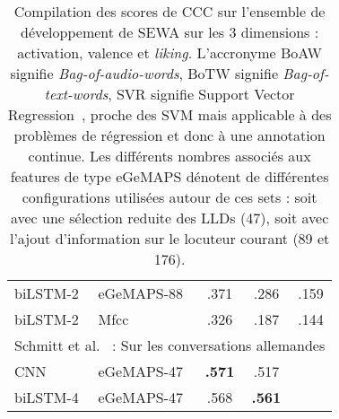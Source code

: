 \begin{table}[]
\begin{tabular}{| l | l | c | c | c |}
        \hline
        biLSTM-2 &eGeMAPS-88  &.371 &.286 &.159 \\
        biLSTM-2 &Mfcc        &.326 &.187 &.144 \\
         \hline
       \multicolumn{5}{|l|}{Schmitt et al.~\cite{Schmitt2019} : Sur les conversations allemandes} \\
       \hline
       \rowcolor{Red}
       CNN      &eGeMAPS-47    &\textbf{.571}  &.517 & \\
       \rowcolor{Red}
       biLSTM-4 &eGeMAPS-47    &.568  &\textbf{.561} & \\
       \hline
    \end{tabular}
    \caption{Compilation des scores de CCC sur l'ensemble de développement de SEWA sur les 3 dimensions : activation, valence et \textit{liking}. L'accronyme BoAW signifie \textit{Bag-of-audio-words}, BoTW signifie \textit{Bag-of-text-words}, SVR signifie Support Vector Regression~\cite{Smola2004}, proche des SVM mais applicable à des problèmes de régression et donc à une annotation continue. Les différents nombres associés aux features de type eGeMAPS dénotent de différentes configurations utilisées autour de ces sets : soit avec une sélection reduite des LLDs (47), soit avec l'ajout d'information sur le locuteur courant (89 et 176).}
    \label{tab:avec}
\end{table}
